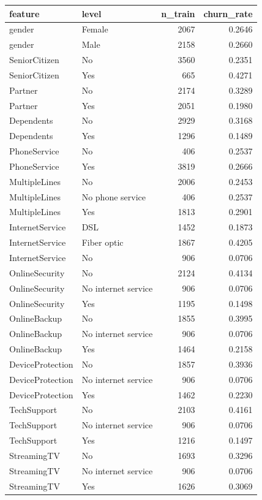 \begin{tabular}{llrr}
\toprule
feature & level & n\_train & churn\_rate \\
\midrule
gender & Female & 2067 & 0.2646 \\
gender & Male & 2158 & 0.2660 \\
SeniorCitizen & No & 3560 & 0.2351 \\
SeniorCitizen & Yes & 665 & 0.4271 \\
Partner & No & 2174 & 0.3289 \\
Partner & Yes & 2051 & 0.1980 \\
Dependents & No & 2929 & 0.3168 \\
Dependents & Yes & 1296 & 0.1489 \\
PhoneService & No & 406 & 0.2537 \\
PhoneService & Yes & 3819 & 0.2666 \\
MultipleLines & No & 2006 & 0.2453 \\
MultipleLines & No phone service & 406 & 0.2537 \\
MultipleLines & Yes & 1813 & 0.2901 \\
InternetService & DSL & 1452 & 0.1873 \\
InternetService & Fiber optic & 1867 & 0.4205 \\
InternetService & No & 906 & 0.0706 \\
OnlineSecurity & No & 2124 & 0.4134 \\
OnlineSecurity & No internet service & 906 & 0.0706 \\
OnlineSecurity & Yes & 1195 & 0.1498 \\
OnlineBackup & No & 1855 & 0.3995 \\
OnlineBackup & No internet service & 906 & 0.0706 \\
OnlineBackup & Yes & 1464 & 0.2158 \\
DeviceProtection & No & 1857 & 0.3936 \\
DeviceProtection & No internet service & 906 & 0.0706 \\
DeviceProtection & Yes & 1462 & 0.2230 \\
TechSupport & No & 2103 & 0.4161 \\
TechSupport & No internet service & 906 & 0.0706 \\
TechSupport & Yes & 1216 & 0.1497 \\
StreamingTV & No & 1693 & 0.3296 \\
StreamingTV & No internet service & 906 & 0.0706 \\
StreamingTV & Yes & 1626 & 0.3069 \\

\end{tabular}
